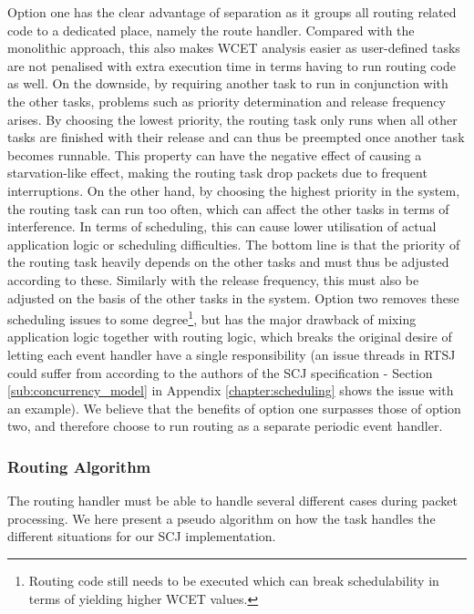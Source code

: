 Option one has the clear advantage of separation as it groups all routing related code to a dedicated place, namely the route handler. Compared with the monolithic approach, this also makes WCET analysis easier as user-defined tasks are not penalised with extra execution time in terms having to run routing code as well. On the downside, by requiring another task to run in conjunction with the other tasks, problems such as priority determination and release frequency arises. By choosing the lowest priority, the routing task only runs when all other tasks are finished with their release and can thus be preempted once another task becomes runnable. This property can have the negative effect of causing a starvation-like effect, making the routing task drop packets due to frequent interruptions. On the other hand, by choosing the highest priority in the system, the routing task can run too often, which can affect the other tasks in terms of interference. In terms of scheduling, this can cause lower utilisation of actual application logic or scheduling difficulties. The bottom line is that the priority of the routing task heavily depends on the other tasks and must thus be adjusted according to these. Similarly with the release frequency, this must also be adjusted on the basis of the other tasks in the system. Option two removes these scheduling issues to some degree\footnote{Routing code still needs to be executed which can break schedulability in terms of yielding higher WCET values.}, but has the major drawback of mixing application logic together with routing logic, which breaks the original desire of letting each event handler have a single responsibility (an issue threads in RTSJ could suffer from according to the authors of the SCJ specification - Section \ref{sub:concurrency_model} in Appendix \ref{chapter:scheduling} shows the issue with an example). We believe that the benefits of option one surpasses those of option two, and therefore choose to run routing as a separate periodic event handler.

\subsubsection{Routing Algorithm}
The routing handler must be able to handle several different cases during packet processing. We here present a pseudo algorithm on how the task handles the different situations for our SCJ implementation.




